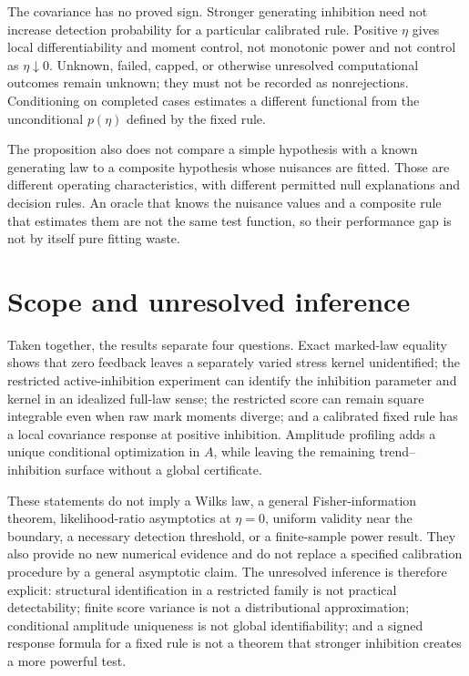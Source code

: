 The covariance has no proved sign. Stronger generating inhibition need not increase detection probability for a particular calibrated rule. Positive \(\eta\) gives local differentiability and moment control, not monotonic power and not control as \(\eta\downarrow0\). Unknown, failed, capped, or otherwise unresolved computational outcomes remain unknown; they must not be recorded as nonrejections. Conditioning on completed cases estimates a different functional from the unconditional \(p(\eta)\) defined by the fixed rule.

The proposition also does not compare a simple hypothesis with a known generating law to a composite hypothesis whose nuisances are fitted. Those are different operating characteristics, with different permitted null explanations and decision rules. An oracle that knows the nuisance values and a composite rule that estimates them are not the same test function, so their performance gap is not by itself pure fitting waste.

\section{Scope and unresolved inference}

Taken together, the results separate four questions. Exact marked-law equality shows that zero feedback leaves a separately varied stress kernel unidentified; the restricted active-inhibition experiment can identify the inhibition parameter and kernel in an idealized full-law sense; the restricted score can remain square integrable even when raw mark moments diverge; and a calibrated fixed rule has a local covariance response at positive inhibition. Amplitude profiling adds a unique conditional optimization in \(A\), while leaving the remaining trend--inhibition surface without a global certificate.

These statements do not imply a Wilks law, a general Fisher-information theorem, likelihood-ratio asymptotics at \(\eta=0\), uniform validity near the boundary, a necessary detection threshold, or a finite-sample power result. They also provide no new numerical evidence and do not replace a specified calibration procedure by a general asymptotic claim. The unresolved inference is therefore explicit: structural identification in a restricted family is not practical detectability; finite score variance is not a distributional approximation; conditional amplitude uniqueness is not global identifiability; and a signed response formula for a fixed rule is not a theorem that stronger inhibition creates a more powerful test.
